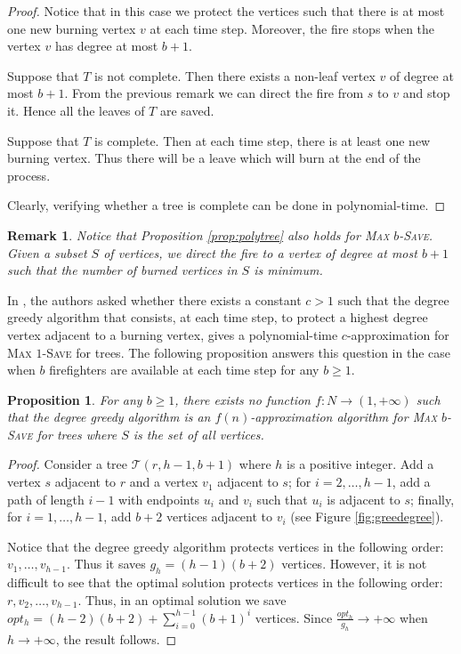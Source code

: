 \documentclass[10pt]{article}
\newcommand{\qedfill}[0]{ }
\newtheorem{remark}{Remark}
\newtheorem{proposition}{Proposition}
\begin{document}
\begin{proof}
Notice that in this case we protect the vertices such that there is at most one new burning vertex $v$ at each time step. Moreover, the fire stops when the vertex $v$ has degree at most $b+1$.

Suppose that $T$ is not complete. Then there exists a non-leaf vertex $v$ of degree at most $b+1$. From the previous remark we can direct the fire from $s$ to $v$ and stop it. Hence all the leaves of $T$ are saved.

Suppose that $T$ is complete. Then at each time step, there is at least one new burning vertex. Thus there will be
a leave which will burn at the end of the process.

Clearly, verifying whether a tree is complete can be done in polynomial-time.\qedfill
\end{proof}

\begin{remark}
Notice that Proposition \ref{prop:polytree} also holds for \textsc{Max $b$-Save}. Given a subset $S$ of vertices, we direct the fire to a vertex of degree at most $b+1$ such that the number of burned vertices in $S$ is minimum.
\end{remark}

In \cite{finbow2009}, the authors asked whether there exists a constant $c > 1$ such that the degree greedy algorithm that consists, at each time step, to protect a highest degree vertex adjacent to a burning vertex, gives a polynomial-time $c$-approximation for \textsc{Max $1$-Save} for trees. The following proposition answers this question in the case when $b$ firefighters are available at each time step for any $b \geq 1$.

\begin{proposition}
For any $b \geq 1$, there exists no function $f:N \to (1,+\infty)$ such that the degree greedy algorithm is an $f(n)$-approximation algorithm for \textsc{Max $b$-Save} for trees where $S$ is the set of all vertices. 
\end{proposition}

\begin{proof}
Consider a tree $\mathcal{T}(r, h-1, b+1)$ where $h$ is a positive integer. Add a vertex $s$ adjacent to $r$ and a vertex $v_1$ adjacent to $s$; for $i = 2, \ldots, h-1$, add a path of length $i-1$ with endpoints $u_i$ and $v_i$ such that $u_i$ is adjacent to $s$; finally, for $i = 1, \ldots, h-1$, add $b+2$ vertices adjacent to $v_i$ (see Figure \ref{fig:greedegree}).

Notice that the degree greedy algorithm protects vertices in the following order: $v_1, \ldots, v_{h-1}$. Thus it saves $g_h = (h-1)(b+2)$ vertices. However, it is not difficult to see that the optimal solution protects vertices  in the following order: $r, v_2, \ldots, v_{h-1}$. Thus, in an optimal solution we save $opt_h = (h-2)(b+2) + \sum_{i=0}^{h-1} (b+1)^{i}$ vertices. Since $\frac{opt_h}{g_h} \rightarrow +\infty$ when $h \rightarrow +\infty$, the result follows.
\end{proof}
\end{document}
